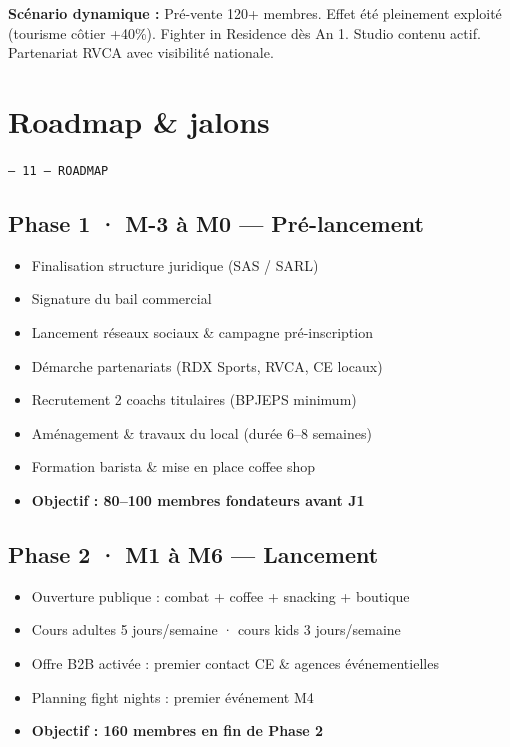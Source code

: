 \documentclass[11pt, a4paper]{article}
\newcommand{\eyebrow}[1]{%
  \vspace{4pt}
  {\small\color{fc-ink3}\texttt{— #1}}
  \vspace{2pt}
}
\begin{document}
\textbf{Scénario dynamique :} Pré-vente 120+ membres. Effet été pleinement exploité (tourisme côtier +40\%). Fighter in Residence dès An 1. Studio contenu actif. Partenariat RVCA avec visibilité nationale.

\section{Roadmap \& jalons}
\eyebrow{11 — ROADMAP}

\subsection{Phase 1 · M-3 à M0 — Pré-lancement}
\begin{itemize}
  \item Finalisation structure juridique (SAS / SARL)
  \item Signature du bail commercial
  \item Lancement réseaux sociaux \& campagne pré-inscription
  \item Démarche partenariats (RDX Sports, RVCA, CE locaux)
  \item Recrutement 2 coachs titulaires (BPJEPS minimum)
  \item Aménagement \& travaux du local (durée 6–8 semaines)
  \item Formation barista \& mise en place coffee shop
  \item \textbf{Objectif : 80–100 membres fondateurs avant J1}
\end{itemize}

\subsection{Phase 2 · M1 à M6 — Lancement}
\begin{itemize}
  \item Ouverture publique : combat + coffee + snacking + boutique
  \item Cours adultes 5 jours/semaine · cours kids 3 jours/semaine
  \item Offre B2B activée : premier contact CE \& agences événementielles
  \item Planning fight nights : premier événement M4
  \item \textbf{Objectif : 160 membres en fin de Phase 2}
\end{itemize}
\end{document}
